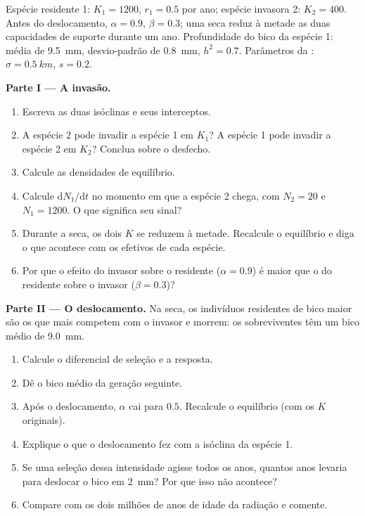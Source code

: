 \begin{problem}
\label{pb:b2:speciation:1}
Espécie residente 1: $K_1 = 1200$, $r_1 = 0.5$ por ano; espécie
invasora 2: $K_2 = 400$. Antes do deslocamento, $\alpha = 0.9$, $\beta =
0.3$; uma seca reduz à metade as duas capacidades de suporte durante um
ano. Profundidade do bico da espécie 1: média de \qty{9.5}{mm},
desvio-padrão de \qty{0.8}{mm}, $h^{2} = 0.7$. Parâmetros da : $\sigma =
\qty{0.5}{km}$, $s = 0.2$.

\medskip
\noindent\textbf{Parte I --- A invasão.}
\begin{enumerate}
  \item Escreva as duas isóclinas e seus interceptos.
  \item A espécie 2 pode invadir a espécie 1 em $K_1$? A espécie 1
        pode invadir a espécie 2 em $K_2$? Conclua sobre o desfecho.
  \item Calcule as densidades de equilíbrio.
  \item Calcule $\mathrm{d}N_1/\mathrm{d}t$ no momento em que a espécie 2
        chega, com $N_2 = 20$ e $N_1 = 1200$. O que significa seu
        sinal?
  \item Durante a seca, os dois $K$ se reduzem à metade. Recalcule o
        equilíbrio e diga o que acontece com os efetivos de cada espécie.
  \item Por que o efeito do invasor sobre o residente ($\alpha = 0.9$)
        é maior que o do residente sobre o invasor ($\beta = 0.3$)?
\end{enumerate}

\medskip
\noindent\textbf{Parte II --- O deslocamento.}
Na seca, os indivíduos residentes de bico maior são os que mais competem
com o invasor e morrem: os sobreviventes têm um bico médio de
\qty{9.0}{mm}.
\begin{enumerate}[resume]
  \item Calcule o diferencial de seleção e a resposta.
  \item Dê o bico médio da geração seguinte.
  \item Após o deslocamento, $\alpha$ cai para $0.5$. Recalcule o
        equilíbrio (com os $K$ originais).
  \item Explique o que o deslocamento fez com a isóclina da espécie 1.
  \item Se uma seleção dessa intensidade agisse todos os anos, quantos
        anos levaria para deslocar o bico em \qty{2}{mm}? Por que
        isso não acontece?
  \item Compare com os dois milhões de anos de idade da radiação e
        comente.
\end{enumerate}


\end{problem}
